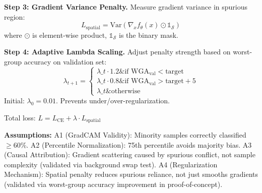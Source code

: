 \textbf{Step 3: Gradient Variance Penalty.} Measure gradient variance in spurious region:  
$$L_{\text{spatial}} = \text{Var}\left(\nabla_x f_\theta(x) \odot \mathbb{1}_\mathcal{S}\right)$$  
where $\odot$ is element-wise product, $\mathbb{1}_\mathcal{S}$ is the binary mask.

\textbf{Step 4: Adaptive Lambda Scaling.} Adjust penalty strength based on worst-group accuracy on validation set:  
$$\lambda_{t+1} = \begin{cases}
\lambda\_t \cdot 1.2 \& \text{if WGA}_{\text{val}} < \text{target} \\
\lambda\_t \cdot 0.8 \& \text{if WGA}_{\text{val}} > \text{target} + 5\\%
\lambda\_t \& \text{otherwise}
\end{cases}$$  
Initial: $\lambda_0 = 0.01$. Prevents under/over-regularization.

Total loss: $L = L_{\text{CE}} + \lambda \cdot L_{\text{spatial}}$

\textbf{Assumptions:}  
A1 (GradCAM Validity): Minority samples correctly classified $\geq 60$\%.  
A2 (Percentile Normalization): 75th percentile avoids majority bias.  
A3 (Causal Attribution): Gradient scattering caused by spurious conflict, not sample complexity (validated via background swap test).  
A4 (Regularization Mechanism): Spatial penalty reduces spurious reliance, not just smooths gradients (validated via worst-group accuracy improvement in proof-of-concept).
